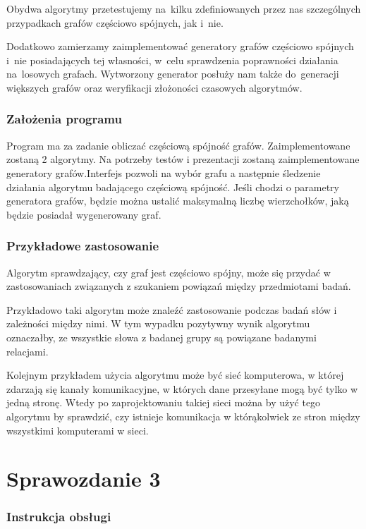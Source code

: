 \documentclass[a4paper,12pt]{mwart}
\begin{document}
Obydwa algorytmy przetestujemy na~kilku zdefiniowanych przez nas szczególnych
przypadkach grafów częściowo spójnych, jak i~nie.

Dodatkowo zamierzamy zaimplementować generatory grafów częściowo spójnych i~nie
posiadających tej własności, w~celu sprawdzenia poprawności działania
na~losowych grafach. Wytworzony generator posłuży nam także do~generacji
większych grafów oraz weryfikacji złożoności czasowych algorytmów.

\section{Założenia programu}

Program ma za zadanie obliczać częściową spójność grafów. Zaimplementowane
zostaną 2 algorytmy. Na potrzeby testów i
prezentacji zostaną zaimplementowane generatory grafów.Interfejs pozwoli na
wybór grafu a
następnie śledzenie działania algorytmu badającego częściową spójność.
Jeśli chodzi o parametry generatora grafów, będzie można ustalić maksymalną liczbę
wierzchołków, jaką będzie posiadał wygenerowany graf.

\section{Przykładowe zastosowanie}

Algorytm sprawdzający, czy graf jest częściowo spójny, może się przydać w
zastosowaniach związanych z szukaniem powiązań między przedmiotami badań.

Przykładowo taki algorytm może znaleźć zastosowanie podczas badań słów i
zależności między nimi. W tym wypadku pozytywny wynik algorytmu oznaczałby, ze
wszystkie słowa z badanej grupy są powiązane badanymi relacjami.

Kolejnym przykładem użycia algorytmu może być sieć komputerowa, w której zdarzają się kanały
komunikacyjne, w których dane przesyłane mogą być tylko w jedną stronę. Wtedy po
zaprojektowaniu takiej sieci można by użyć tego algorytmu by sprawdzić, czy
istnieje komunikacja w którąkolwiek ze stron między wszystkimi komputerami w
sieci.

\newpage

\part{Sprawozdanie 3}

\section{Instrukcja obsługi}
\end{document}
